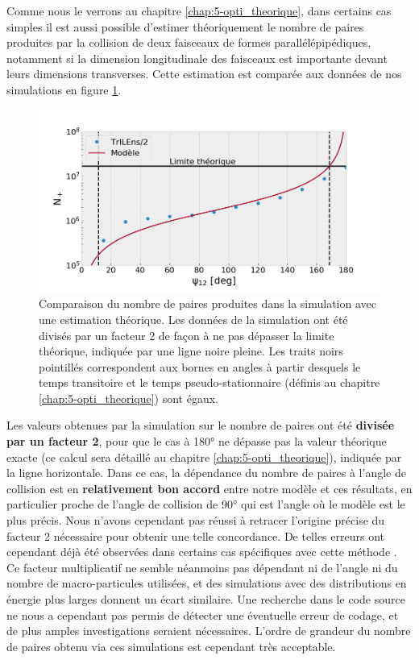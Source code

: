 \begin{refsection}
Comme nous le verrons au chapitre \ref{chap:5-opti_theorique}, dans certains cas simples il est aussi possible d'estimer théoriquement le nombre de paires produites par la collision de deux faisceaux de formes parallélépipédiques, notamment si la dimension longitudinale des faisceaux est importante devant leurs dimensions transverses. Cette estimation est comparée aux données de nos simulations en figure \ref{fig:4-trilens_validation_Np}.

\begin{figure}[hbtp]
	\centering
	\includegraphics[width=0.7\linewidth]{4-simulation/TrILEns_validation_Np.png}
	\caption{Comparaison du nombre de paires produites dans la simulation avec une estimation théorique. Les données de la simulation ont été divisés par un facteur 2 de façon à ne pas dépasser la limite théorique, indiquée par une ligne noire pleine. Les traits noirs pointillés correspondent aux bornes en angles à partir desquels le temps transitoire et le temps pseudo-stationnaire (définis au chapitre \ref{chap:5-opti_theorique}) sont égaux.}
	\label{fig:4-trilens_validation_Np}
\end{figure}

Les valeurs obtenues par la simulation sur le nombre de paires ont été \textbf{divisée par un facteur 2}, pour que le cas à 180° ne dépasse pas la valeur théorique exacte (ce calcul sera détaillé au chapitre \ref{chap:5-opti_theorique}), indiquée par la ligne horizontale. Dans ce cas, la dépendance du nombre de paires à l'angle de collision est en \textbf{relativement bon accord} entre notre modèle et ces résultats, en particulier proche de l'angle de collision de 90° qui est l'angle où le modèle est le plus précis. Nous n'avons cependant pas réussi à retracer l'origine précise du facteur 2 nécessaire pour obtenir une telle concordance. De telles erreurs ont cependant déjà été observées dans certains cas spécifiques avec cette méthode \parencite{jansen_2018}. Ce facteur multiplicatif ne semble néanmoins pas dépendant ni de l'angle ni du nombre de macro-particules utilisées, et des simulations avec des distributions en énergie plus larges donnent un écart similaire. Une recherche dans le code source ne nous a cependant pas permis de détecter une éventuelle erreur de codage, et de plus amples investigations seraient nécessaires. L'ordre de grandeur du nombre de paires obtenu via ces simulations est cependant très acceptable. 



\end{refsection}
